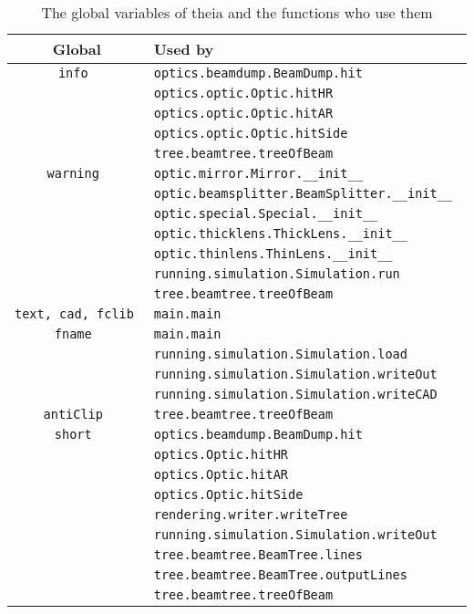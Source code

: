 \documentclass{article}
\begin{document}
\begin{table}[h]
\begin{center}

\begin{tabular}{|c | l |}
\hline
\textbf{Global} & \textbf{Used by} \\ \hline \hline

\tt{info} & \tt{optics.beamdump.BeamDump.hit} \\
& \tt{optics.optic.Optic.hitHR} \\
& \tt{optics.optic.Optic.hitAR} \\
& \tt{optics.optic.Optic.hitSide} \\
& \tt{tree.beamtree.treeOfBeam} \\ \hline

\tt{warning} & \tt{optic.mirror.Mirror.\_\_init\_\_} \\
&\tt{optic.beamsplitter.BeamSplitter.\_\_init\_\_} \\
&\tt{optic.special.Special.\_\_init\_\_} \\
& \tt{optic.thicklens.ThickLens.\_\_init\_\_} \\
& \tt{optic.thinlens.ThinLens.\_\_init\_\_} \\
& \tt{running.simulation.Simulation.run} \\
& \tt{tree.beamtree.treeOfBeam} \\ \hline

\tt{text, cad, fclib} & \tt{main.main} \\ \hline

\tt{fname} & \tt{main.main} \\
& \tt{running.simulation.Simulation.load} \\
& \tt{running.simulation.Simulation.writeOut} \\
& \tt{running.simulation.Simulation.writeCAD} \\ \hline

\tt{antiClip} & \tt{tree.beamtree.treeOfBeam} \\ \hline
\tt{short} & \tt{optics.beamdump.BeamDump.hit} \\
& \tt{optics.Optic.hitHR} \\
& \tt{optics.Optic.hitAR} \\
& \tt{optics.Optic.hitSide} \\
& \tt{rendering.writer.writeTree} \\
& \tt{running.simulation.Simulation.writeOut} \\
& \tt{tree.beamtree.BeamTree.lines} \\
& \tt{tree.beamtree.BeamTree.outputLines} \\
& \tt{tree.beamtree.treeOfBeam} \\ \hline

\end{tabular}
\caption{The global variables of theia and the functions who use them}
\label{globals}
\end{center}
\end{table}
\end{document}
